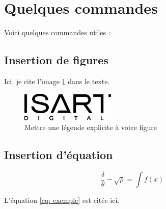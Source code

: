\documentclass{rapportcs}
\begin{document}

    \newpage






    \section{Quelques commandes}

    Voici quelques commandes utiles :



    \subsection{Insertion de figures}
    Ici, je cite l'image \ref{fig:my_label} dans le texte.
    \begin{figure}[h!]
        \centering
        \includegraphics[width=0.4\textwidth]{logos/Logo_ISART.png}
        \caption{Mettre une légende explicite à votre figure}
        \label{fig:my_label}
    \end{figure}

    \subsection{Insertion d'équation}

    \begin{equation} \label{eq: exemple}
    \frac{\delta}{\theta} - \sqrt{\rho}  = \int f(x)
    \end{equation}

    L'équation \ref{eq: exemple} est citée ici.
\end{document}
